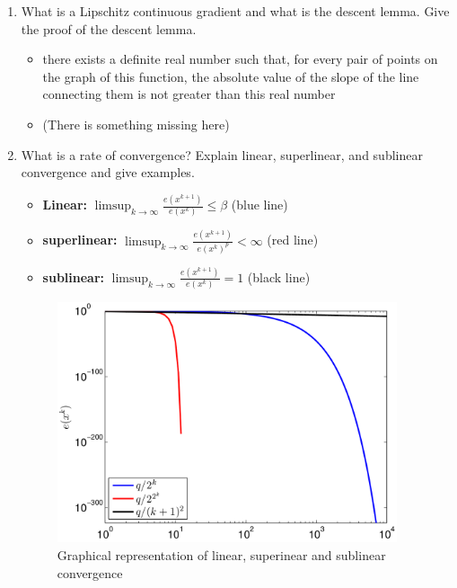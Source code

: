 \documentclass{report}
\newcommand{\question}[1]{{\small\textsf{#1}}}
\begin{document}
\begin{enumerate}
\item \question{What is a Lipschitz continuous gradient and what is the descent lemma.  Give the
    proof of the descent lemma.}

  \begin{itemize}
  \item there exists a definite real number such that, for every pair of points on the graph of this
    function, the absolute value of the slope of the line connecting them is not greater than this
    real number	
  \item (There is something missing here)

  \end{itemize}

\item \question{What is a rate of convergence? Explain linear, superlinear, and sublinear
    convergence and give examples.}
  \begin{itemize}
  \item \textbf{Linear:} $\limsup_{k \rightarrow \infty} \frac{e(x^{k+1})}{e(x^k)}\leq \beta$ (blue
    line)
  \item \textbf{superlinear:} $\limsup_{k \rightarrow \infty} \frac{e(x^{k+1})}{e(x^k)^p} < \infty$
    (red line)
  \item \textbf{sublinear:} $\limsup_{k \rightarrow \infty} \frac{e(x^{k+1})}{e(x^k)} = 1$ (black
    line)
  \end{itemize}

\begin{figure}[H]
\includegraphics[width=10cm]{convergence.png}
\caption{Graphical representation of linear, superinear and sublinear convergence \label{fig:desc_dir}}
\end{figure}


\end{enumerate}
\end{document}
